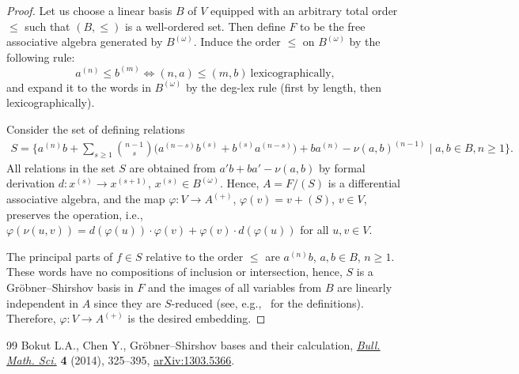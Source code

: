 \documentclass[10pt,a4paper]{amsart}
\numberwithin{equation}{section}
\begin{document}
\begin{proof}
Let us choose a linear basis $B$ of $V$
equipped with an arbitrary total order $\le $
such that $(B,\le )$ is a well-ordered set.
Then define $F$ to be the free associative algebra
generated by $B^{(\omega )}$.
Induce the order $\le $ on $B^{(\omega )}$
by the following rule:
\[
a^{(n)} \le b^{(m)} \iff (n,a)\le (m,b)\ \text{lexicographically},
\]
and expand it to the words in $B^{(\omega )}$ by the deg-lex rule
(first by length, then lexicographically).

Consider the set of defining relations
\begin{gather*}
S = \bigg\{a^{(n)}b + \sum\limits_{s\ge 1} \binom{n-1}{s}\!
\bigl(a^{(n-s)}b^{(s)} +b^{(s)}a^{(n-s)} \bigr)
+ba^{(n)} - \nu(a,b)^{(n-1)} \mid a,b\in B, n\ge 1\bigg \}.
\end{gather*}
All relations in the set $S$ are obtained
from $a'b+ba'-\nu(a,b)$ by formal derivation
$d\colon x^{(s)}\to x^{(s+1)}$, $x^{(s)}\in B^{(\omega )}$.
Hence, $A=F/(S)$ is a differential associative algebra,
and the map $\varphi \colon V\to A^{(+)}$, $\varphi( v)= v+(S)$, $v\in V$,
preserves the operation, i.e.,
$\varphi(\nu(u,v)) =
d(\varphi(u))\cdot \varphi (v) +\varphi(v)\cdot d(\varphi(u))$ for all $u,v\in V$.

The principal parts of $f\in S$ relative to the order
$\le $ are $a^{(n)}b$, $a,b\in B$, $n\ge 1$.
These words have no compositions of inclusion or intersection, hence, $S$ is a Gr\"obner--Shirshov
basis in $F$ and the images of all variables from $B$ are linearly independent in $A$ since they are $S$-reduced (see, e.g.,~\cite{BC-bull2014} for the
definitions).
Therefore, $\varphi \colon V\to A^{(+)}$ is the desired embedding.
\end{proof}

\begin{thebibliography}{99}
Bokut L.A., Chen Y., Gr\"obner--{S}hirshov bases and their calculation,
 \href{https://doi.org/10.1007/s13373-014-0054-6}{\textit{Bull. Math. Sci.}} \textbf{4} (2014), 325--395, \href{https://arxiv.org/abs/1303.5366}{arXiv:1303.5366}.
\end{thebibliography}
\end{document}
